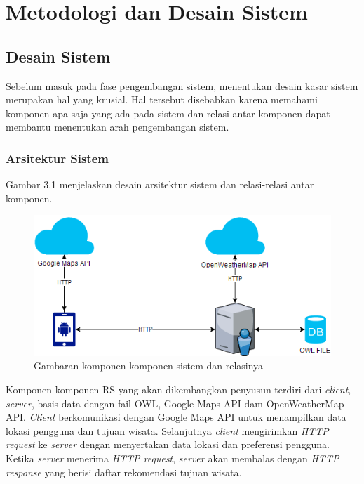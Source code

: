 \chapter{Metodologi dan Desain Sistem}

\section{Desain Sistem}
Sebelum masuk pada fase pengembangan sistem, menentukan desain kasar sistem merupakan hal yang krusial. Hal tersebut disebabkan karena memahami komponen apa saja yang ada pada sistem dan relasi antar komponen dapat membantu menentukan arah pengembangan sistem. 
 
\subsection{Arsitektur Sistem}
\par
Gambar 3.1 menjelaskan desain arsitektur sistem dan relasi-relasi antar komponen.
\newline
\begin{figure}[h!]
    \centering
    \includegraphics[scale=0.5]{img/arsitektur_sistem.png}
    \caption{Gambaran komponen-komponen sistem dan relasinya}
    \label{fig:Gambar}
\end{figure}
\par
Komponen-komponen RS yang akan dikembangkan penyusun terdiri dari \textit{client}, \textit{server}, basis data dengan fail OWL, Google Maps API dam OpenWeatherMap API. 
\textit{Client} berkomunikasi dengan Google Maps API untuk menampilkan data lokasi pengguna dan tujuan wisata. Selanjutnya \textit{client} mengirimkan \textit{HTTP request} ke 
\textit{server} dengan menyertakan data lokasi dan preferensi pengguna. Ketika \textit{server} menerima \textit{HTTP request}, \textit{server} akan membalas dengan 
\textit{HTTP response} yang berisi daftar rekomendasi tujuan wisata.

